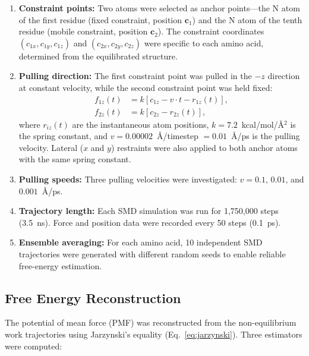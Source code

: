 \documentclass[12pt]{article}
\begin{document}
\begin{enumerate}
    \item \textbf{Constraint points:} Two atoms were selected as anchor points---the N atom of the first residue (fixed constraint, position $\mathbf{c}_1$) and the N atom of the tenth residue (mobile constraint, position $\mathbf{c}_2$). The constraint coordinates $(c_{1x}, c_{1y}, c_{1z})$ and $(c_{2x}, c_{2y}, c_{2z})$ were specific to each amino acid, determined from the equilibrated structure.
    
    \item \textbf{Pulling direction:} The first constraint point was pulled in the $-z$ direction at constant velocity, while the second constraint point was held fixed:
    \begin{align}
        f_{1z}(t) &= k \left[ c_{1z} - v \cdot t - r_{1z}(t) \right], \\
        f_{2z}(t) &= k \left[ c_{2z} - r_{2z}(t) \right],
    \end{align}
    where $r_{iz}(t)$ are the instantaneous atom positions, $k = 7.2$~kcal/mol/\AA$^2$ is the spring constant, and $v = 0.00002$~\AA/timestep $= 0.01$~\AA/ps is the pulling velocity. Lateral ($x$ and $y$) restraints were also applied to both anchor atoms with the same spring constant.
    
    \item \textbf{Pulling speeds:} Three pulling velocities were investigated: $v = 0.1$, $0.01$, and $0.001$~\AA/ps.
    
    \item \textbf{Trajectory length:} Each SMD simulation was run for 1,750,000 steps (3.5~ns). Force and position data were recorded every 50 steps (0.1~ps).
    
    \item \textbf{Ensemble averaging:} For each amino acid, 10 independent SMD trajectories were generated with different random seeds to enable reliable free-energy estimation.
\end{enumerate}

\subsection{Free Energy Reconstruction}

The potential of mean force (PMF) was reconstructed from the non-equilibrium work trajectories using Jarzynski's equality (Eq.~\ref{eq:jarzynski}). Three estimators were computed:
\end{document}
